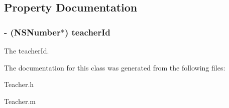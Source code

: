 \subsection{\-Property \-Documentation}
\hypertarget{interface_teacher_a7662ecb73144ebf2698113911d164dc6}{
\subsubsection[{teacher\-Id}]{\setlength{\rightskip}{0pt plus 5cm}-\/ (\-N\-S\-Number$\ast$) {\bf teacher\-Id}}}\label{interface_teacher_a7662ecb73144ebf2698113911d164dc6}
\-The teacher\-Id. 

\-The documentation for this class was generated from the following files\-:\begin{DoxyCompactItemize}
\item 
\-Teacher.\-h\item 
\-Teacher.\-m\end{DoxyCompactItemize}
